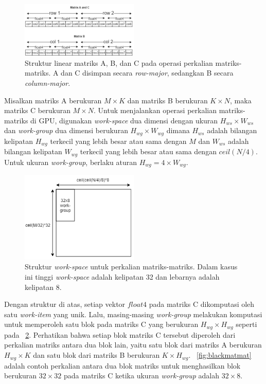 \begin{figure}
	\centering
	\includegraphics[width=0.50\textwidth]
	{pics/linearmatmat.png}
	\caption{Struktur linear matriks A, B, dan C pada operasi perkalian matriks-matriks. A dan C disimpan secara \textit{row-major}, sedangkan B secara \textit{column-major}.}
	\label{fig:linearmatmat}
\end{figure}

Misalkan matriks A berukuran $M \times K$ dan matriks B berukuran $K \times N$, maka matriks C berukuran $M \times N$. Untuk menjalankan operasi perkalian matriks-matriks di GPU, digunakan \textit{work-space} dua dimensi dengan ukuran $H_{ws} \times W_{ws}$ dan \textit{work-group} dua dimensi berukuran $H_{wg} \times W_{wg}$ dimana $H_{ws}$ adalah bilangan kelipatan $H_{wg}$ terkecil yang lebih besar atau sama dengan $M$ dan $W_{ws}$ adalah bilangan kelipatan $W_{wg}$ terkecil yang lebih besar atau sama dengan $ceil(N/4)$. Untuk ukuran \textit{work-group}, berlaku aturan $H_{wg} = 4 \times W_{wg}$. 

\begin{figure}
	\centering
	\includegraphics[width=0.50\textwidth]
	{pics/wimatmat.png}
	\caption{Struktur \textit{work-space} untuk perkalian matriks-matriks. Dalam kasus ini tinggi \textit{work-space} adalah kelipatan 32 dan lebarnya adalah kelipatan 8.}
	\label{fig:wimatmat}
\end{figure}

Dengan struktur di atas, setiap vektor $float4$ pada matriks C dikomputasi oleh satu \textit{work-item} yang unik. Lalu, masing-masing \textit{work-group} melakukan komputasi untuk memperoleh satu blok pada matriks C yang berukuran $H_{wg} \times H_{wg}$ seperti pada \pic~\ref{fig:wimatmat}. Perhatikan bahwa setiap blok matriks C tersebut diperoleh dari perkalian matriks antara dua blok lain, yaitu satu blok dari matriks A berukuran $H_{wg} \times K$ dan satu blok dari matriks B berukuran $K \times H_{wg}$. \pic~\ref{fig:blackmatmat} adalah contoh perkalian antara dua blok matriks untuk menghasilkan blok berukuran $32 \times 32$ pada matriks C ketika ukuran \textit{work-group} adalah $32 \times 8$.

